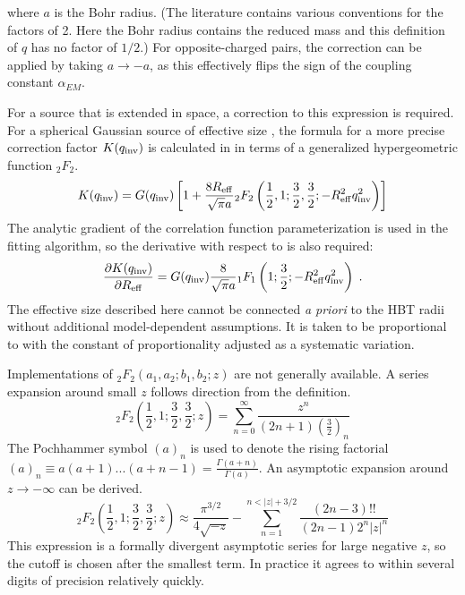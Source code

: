 where $a$ is the Bohr radius.
(The literature contains various conventions for the factors of 2.
Here the Bohr radius contains the reduced mass and this definition of $q$ has no factor of $1/2$.)
For opposite-charged pairs, the correction can be applied by taking $a \to -a$, as this effectively flips the sign of the coupling constant $\alpha_{EM}$.

For a source that is extended in space, a correction to this expression is required.
For a spherical Gaussian source of effective size \Reff, the formula for a more precise correction factor $K(q_{\mathrm{inv}})$ is calculated in  in terms of a generalized hypergeometric function ${}_2 F_2$.
\begin{equation} K(q_{\mathrm{inv}}) = G(q_{\mathrm{inv}}) \left[ 1 + \frac{8R_{\mathrm{eff}}}{\sqrt{\pi}a} {}_2 F_2 \left( \frac{1}{2}, 1; \frac{3}{2}, \frac{3}{2}; -R_{\mathrm{eff}}^2 q_{\mathrm{inv}}^2 \right) \right] \end{equation}
The analytic gradient of the correlation function parameterization is used in the fitting algorithm, so the derivative with respect to \Reff is also required:
\begin{equation}
  \frac{\partial K(q_{\mathrm{inv}})}{\partial R_{\mathrm{eff}}} = G(q_{\mathrm{inv}}) \frac{8}{\sqrt{\pi}a} {}_1 F_1 \left( 1; \frac{3}{2}; -R_{\mathrm{eff}}^2 q_{\mathrm{inv}}^2 \right) \; .
\end{equation}
The effective size \Reff described here cannot be connected \emph{a priori} to the HBT radii without additional model-dependent assumptions.
It is taken to be proportional to \Rinv with the constant of proportionality adjusted as a systematic variation.

Implementations of ${}_2F_2 (a_1, a_2; b_1, b_2; z)$ are not generally available.
A series expansion around small $z$ follows direction from the definition.
\begin{equation} {}_2F_2 \left( \frac{1}{2}, 1; \frac{3}{2}, \frac{3}{2}; z \right) = \sum_{n=0}^{\infty} \frac{z^n}{(2n+1) \left(\frac{3}{2}\right)_n} \end{equation}
The Pochhammer symbol $(a)_n$ is used to denote the rising factorial $(a)_n \equiv a(a+1)...(a+n-1) = \frac{\Gamma(a+n)}{\Gamma(a)}$.
An asymptotic expansion around $z \to - \infty$ can be derived.
\begin{equation} {}_2F_2 \left( \frac{1}{2}, 1; \frac{3}{2}, \frac{3}{2}; z \right) \approx \frac{\pi^{3/2}}{4\sqrt{-z}} - \sum_{n=1}^{n < |z| + 3/2} \frac{(2n-3)!!}{(2n-1) 2^n |z|^n}  \end{equation}
This expression is a formally divergent asymptotic series for large negative $z$, so the cutoff is chosen after the smallest term.
In practice it agrees to within several digits of precision relatively quickly.

